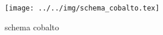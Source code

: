 \begin{figure}[h]\centering\texttt{[image: ../../img/schema\_cobalto.tex]}\caption{schema cobalto}\label{fig:schema_cobalto}\end{figure}

